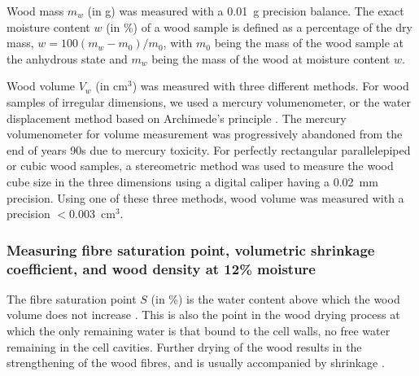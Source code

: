\documentclass[a4paper, 12pt, leqno, dvipsnames]{article}\usepackage[]{graphicx}\usepackage[]{color}
\begin{document}
Wood mass $m_w$ (in g) was measured with a 0.01~g precision balance. The exact moisture content $w$ (in \%) of a wood sample is defined as a percentage of the dry mass, $w=100(m_w-m_0)/m_0$, with $m_0$ being the mass of the wood sample at the anhydrous state and $m_w$ being the mass of the wood at moisture content $w$. 

Wood volume $V_w$ (in cm$^3$) was measured with three different methods. For wood samples of irregular dimensions, we used a mercury volumenometer, or the water displacement method based on Archimede's principle \citep{Williamson2010}. The mercury volumenometer for volume measurement was progressively abandoned from the end of years 90s due to mercury toxicity. For perfectly rectangular parallelepiped or cubic wood samples, a stereometric method was used to measure the wood cube size in the three dimensions using a digital caliper having a 0.02~mm precision. Using one of these three methods, wood volume was measured with a precision $<$0.003~cm$^3$.

\subsubsection{Measuring fibre saturation point, volumetric shrinkage coefficient, and wood density at 12\% moisture}

The fibre saturation point $S$ (in \%) is the water content above which the wood volume does not increase \citep{Skaar1988}. This is also the point in the wood drying process at which the only remaining water is that bound to the cell walls, no free water remaining in the cell cavities. Further drying of the wood results in the strengthening of the wood fibres, and is usually accompanied by shrinkage \citep{Skaar1988}.
\end{document}
